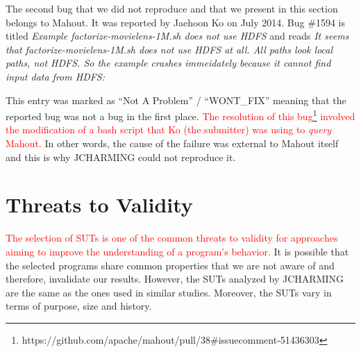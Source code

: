 \documentclass[times, doublespace]{smrauth}
\newcommand{\red}[1]{\textcolor{red}{#1}}
\begin{document}
The second bug that we did not reproduce and
that we present in this section belongs to Mahout. It was reported by
Jaehoon Ko on July 2014. Bug \#1594 is titled {\it Example factorize-movielens-1M.sh does not use HDFS}
and reads {\it It seems that factorize-movielens-1M.sh does not use HDFS at all.
All paths look local paths, not HDFS. So the example crashes
immeidately because it cannot find input data from HDFS: }

\vspace*{0.3cm}

\noindent{}

\vspace*{0.3cm}

This entry was marked as ``Not A Problem'' / ``WONT\_FIX'' meaning that
the reported bug was not a bug in the first place.
\red{The resolution of this bug\footnote{https://github.com/apache/mahout/pull/38\#issuecomment-51436303}
involved the modification of a bash script that Ko (the submitter) was using to {\it query} Mahout.} In other words, the cause of the failure was external to Mahout itself and this is why JCHARMING could not reproduce it.

\section{Threats to Validity\label{sec:threats}}

\red{The selection of SUTs is one of the common threats to validity
for approaches aiming to improve the understanding of a
program's behavior.} It is possible that the selected programs
share common properties that we are not aware of and
therefore, invalidate our results. However, the SUTs analyzed
by JCHARMING are the same as the ones used in similar
studies. Moreover, the SUTs vary in terms of purpose, size
and history.
\end{document}
